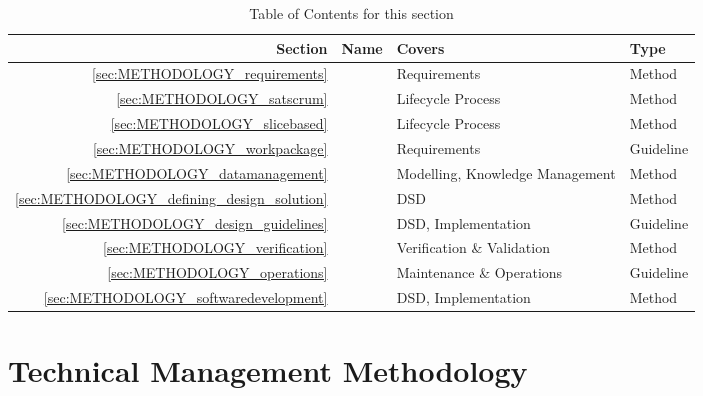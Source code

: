 \documentclass[a4paper,nobib,justified,final]{tufte-book}
\begin{document}
\begin{table}
	\begin{tabularx}{\linewidth}{@{}rXp{5cm}l@{}}
		\toprule
		\textbf{Section} & \textbf{Name} & \textbf{Covers} & \textbf{Type} \\ \midrule
		\ref{sec:METHODOLOGY_requirements} & \nameref*{sec:METHODOLOGY_requirements} & Requirements & Method \\
		\ref{sec:METHODOLOGY_satscrum} & \nameref*{sec:METHODOLOGY_satscrum} & Lifecycle Process & Method \\
		\ref{sec:METHODOLOGY_slicebased} & \nameref*{sec:METHODOLOGY_slicebased} & Lifecycle Process & Method \\
		\ref{sec:METHODOLOGY_workpackage} & \nameref*{sec:METHODOLOGY_workpackage} & Requirements & Guideline \\
		\ref{sec:METHODOLOGY_datamanagement} & \nameref*{sec:METHODOLOGY_datamanagement} & Modelling, Knowledge Management & Method \\
		\ref{sec:METHODOLOGY_defining_design_solution} & \nameref*{sec:METHODOLOGY_defining_design_solution} & \acf{DSD} & Method \\
		\ref{sec:METHODOLOGY_design_guidelines} & \nameref*{sec:METHODOLOGY_design_guidelines} & \acs{DSD}, Implementation & Guideline \\
		\ref{sec:METHODOLOGY_verification} & \nameref*{sec:METHODOLOGY_verification} & Verification \& Validation & Method \\
		\ref{sec:METHODOLOGY_operations} & \nameref*{sec:METHODOLOGY_operations} & Maintenance \& Operations & Guideline \\
		\ref{sec:METHODOLOGY_softwaredevelopment} & \nameref*{sec:METHODOLOGY_softwaredevelopment} & \acs{DSD}, Implementation & Method \\
		\bottomrule
	\end{tabularx}
	\caption{Table of Contents for this section}
	\label{tab:m_toc}
\end{table}

\FloatBarrier

\newpage
\section{Technical Management Methodology}
\label{sec:METHODOLOGY_technicalmanagement}
\end{document}
